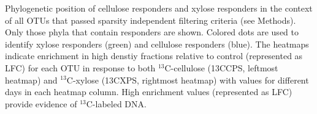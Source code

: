 Phylogenetic position of cellulose responders and xylose responders in the context of all OTUs that passed 
sparsity independent filtering criteria (see Methods). Only those phyla that contain responders are shown.
Colored dots are used to identify xylose responders (green) and cellulose
responders (blue). The heatmaps indicate enrichment in high denstiy fractions
relative to control (represented as LFC) for each OTU in response to both
$^{13}$C-cellulose (13CCPS, leftmost heatmap) and $^{13}$C-xylose
(13CXPS, rightmost heatmap) with values for different days in each heatmap
column. High enrichment values (represented as LFC) provide evidence of $^{13}$C-labeled DNA.  

